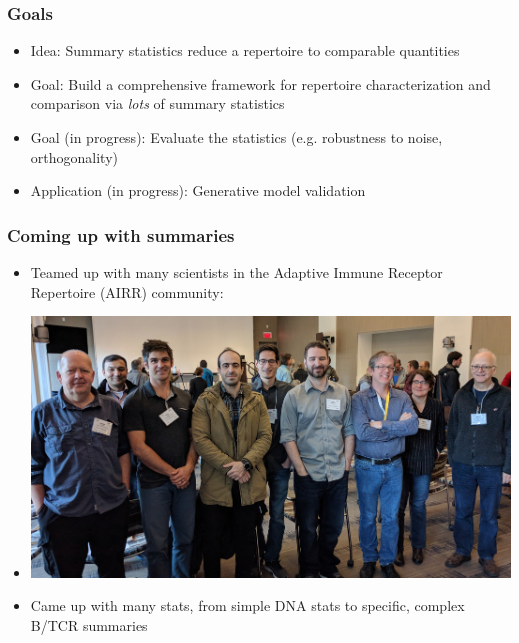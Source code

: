 \documentclass[mathserif,compress]{beamer}
\renewcommand\;{\,}
\begin{document}
\begin{frame}\frametitle{Goals}
\begin{itemize}
\item
Idea: Summary statistics reduce a repertoire to comparable quantities
\bigskip
\item
Goal: Build a comprehensive framework for repertoire characterization and comparison via \emph{lots} of summary statistics
\bigskip
\item
Goal (in progress): Evaluate the statistics (e.g. robustness to noise, orthogonality) 
\bigskip
\item
Application (in progress): Generative model validation
\end{itemize}
\end{frame}

\begin{frame}\frametitle{Coming up with summaries}
\begin{itemize}
\item
Teamed up with many scientists in the Adaptive Immune Receptor Repertoire (AIRR) community:
\bigskip
\item[]
\begin{center}
\includegraphics[width=0.9\linewidth]{Images/AIRR.png}
\end{center}
\bigskip
\item
Came up with many stats, from simple DNA stats to specific, complex B/TCR summaries
\end{itemize}
\end{frame}
\end{document}
